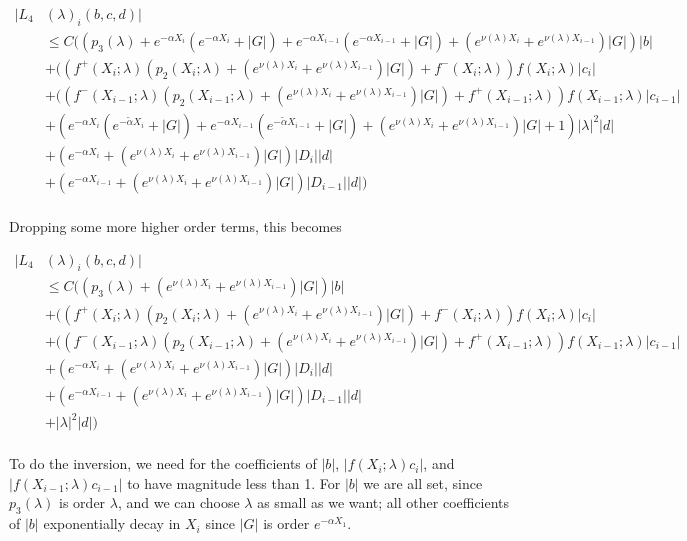 \documentclass[12pt]{article}
\begin{document}
\begin{enumerate}
\begin{align*}
|L_4&(\lambda)_i(b, c, d)|\\ 
&\leq C\Big(( p_3(\lambda) + e^{-\alpha X_i}( e^{-\alpha X_i} + |G|) + e^{-\alpha X_{i-1}}( e^{-\alpha X_{i-1}} + |G|) + (e^{\nu(\lambda)X_i} + e^{\nu(\lambda)X_{i-1}}) |G| )|b| \\ 
&+ ((f^+(X_i; \lambda) (p_2(X_i; \lambda) + (e^{\nu(\lambda)X_i} + e^{\nu(\lambda)X_{i-1}})|G|) + f^-(X_i; \lambda) ) f(X_i; \lambda) |c_i| \\
&+ ((f^-(X_{i-1}; \lambda) (p_2(X_{i-1}; \lambda) + (e^{\nu(\lambda)X_i} + e^{\nu(\lambda)X_{i-1}})|G|) + f^+(X_{i-1}; \lambda) ) f(X_{i-1}; \lambda) |c_{i-1}| \\
&+ ( e^{-\alpha X_i}(e^{-\tilde{\alpha} X_i} + |G|) + e^{-\alpha X_{i-1}}(e^{-\tilde{\alpha} X_{i-1}} + |G|) + (e^{\nu(\lambda)X_i} + e^{\nu(\lambda)X_{i-1}}) |G| + 1) |\lambda|^2 |d| \\ 
&+ (e^{-\alpha X_i} + (e^{\nu(\lambda)X_i} + e^{\nu(\lambda)X_{i-1}}) |G| ) |D_i||d| \\
&+ (e^{-\alpha X_{i-1}} + (e^{\nu(\lambda)X_i} + e^{\nu(\lambda)X_{i-1}}) |G| ) |D_{i-1}||d|\Big)  \\
\end{align*}

Dropping some more higher order terms, this becomes

\begin{align*}
|L_4&(\lambda)_i(b, c, d)|\\ 
&\leq C\Big(( p_3(\lambda) + (e^{\nu(\lambda)X_i} + e^{\nu(\lambda)X_{i-1}}) |G| )|b| \\ 
&+ ((f^+(X_i; \lambda) (p_2(X_i; \lambda) + (e^{\nu(\lambda)X_i} + e^{\nu(\lambda)X_{i-1}})|G|) + f^-(X_i; \lambda) ) f(X_i; \lambda) |c_i| \\
&+ ((f^-(X_{i-1}; \lambda) (p_2(X_{i-1}; \lambda) + (e^{\nu(\lambda)X_i} + e^{\nu(\lambda)X_{i-1}})|G|) + f^+(X_{i-1}; \lambda) ) f(X_{i-1}; \lambda) |c_{i-1}| \\
&+ (e^{-\alpha X_i} + (e^{\nu(\lambda)X_i} + e^{\nu(\lambda)X_{i-1}}) |G| ) |D_i||d| \\
&+ (e^{-\alpha X_{i-1}} + (e^{\nu(\lambda)X_i} + e^{\nu(\lambda)X_{i-1}}) |G| ) |D_{i-1}||d| \\
&+ |\lambda|^2 |d| \Big) \\
\end{align*}

To do the inversion, we need for the coefficients of $|b|$, $|f(X_i; \lambda) c_i|$, and $|f(X_{i-1}; \lambda) c_{i-1}|$ to have magnitude less than 1. For $|b|$ we are all set, since $p_3(\lambda)$ is order $\lambda$, and we can choose $\lambda$ as small as we want; all other coefficients of $|b|$ exponentially decay in $X_i$ since $|G|$ is order $e^{-\alpha X_1}$. \\


\end{enumerate}
\end{document}
